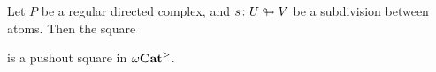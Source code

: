 \begin{lem} \label{lem:rewrite_condition_for_gray}
    Let \( P \) be a regular directed complex, and \( s \colon U \looparrowright V \) be a subdivision between atoms.
    Then the square
    \begin{center}
    \end{center}
    is a pushout square in \( {\omega\mathbf{Cat}}^> \).
\end{lem}

